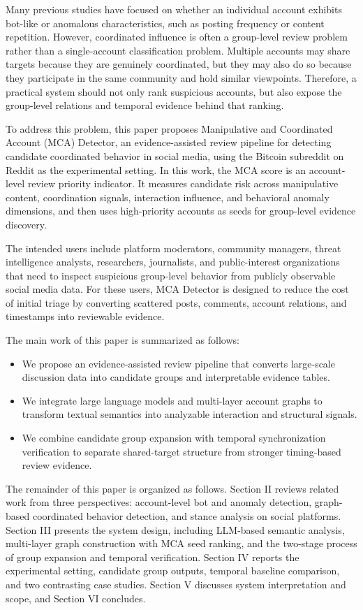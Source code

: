 \documentclass[conference]{IEEEtran}
\begin{document}
Many previous studies have focused on whether an individual account exhibits bot-like or anomalous characteristics, such as posting frequency or content repetition. However, coordinated influence is often a group-level review problem rather than a single-account classification problem. Multiple accounts may share targets because they are genuinely coordinated, but they may also do so because they participate in the same community and hold similar viewpoints. Therefore, a practical system should not only rank suspicious accounts, but also expose the group-level relations and temporal evidence behind that ranking.

To address this problem, this paper proposes Manipulative and Coordinated Account (MCA) Detector, an evidence-assisted review pipeline for detecting candidate coordinated behavior in social media, using the Bitcoin subreddit on Reddit as the experimental setting. In this work, the MCA score is an account-level review priority indicator. It measures candidate risk across manipulative content, coordination signals, interaction influence, and behavioral anomaly dimensions, and then uses high-priority accounts as seeds for group-level evidence discovery.

The intended users include platform moderators, community managers, threat intelligence analysts, researchers, journalists, and public-interest organizations that need to inspect suspicious group-level behavior from publicly observable social media data. For these users, MCA Detector is designed to reduce the cost of initial triage by converting scattered posts, comments, account relations, and timestamps into reviewable evidence.

The main work of this paper is summarized as follows:
\begin{itemize}
    \item We propose an evidence-assisted review pipeline that converts large-scale discussion data into candidate groups and interpretable evidence tables.
    \item We integrate large language models and multi-layer account graphs to transform textual semantics into analyzable interaction and structural signals.
    \item We combine candidate group expansion with temporal synchronization verification to separate shared-target structure from stronger timing-based review evidence.
\end{itemize}

The remainder of this paper is organized as follows. Section II reviews
related work from three perspectives: account-level bot and anomaly
detection, graph-based coordinated behavior detection, and stance analysis on
social platforms. Section III presents the system design, including LLM-based
semantic analysis, multi-layer graph construction with MCA seed ranking, and
the two-stage process of group expansion and temporal verification. Section
IV reports the experimental setting, candidate group outputs, temporal
baseline comparison, and two contrasting case studies. Section V discusses
system interpretation and scope, and Section VI concludes.
\end{document}
